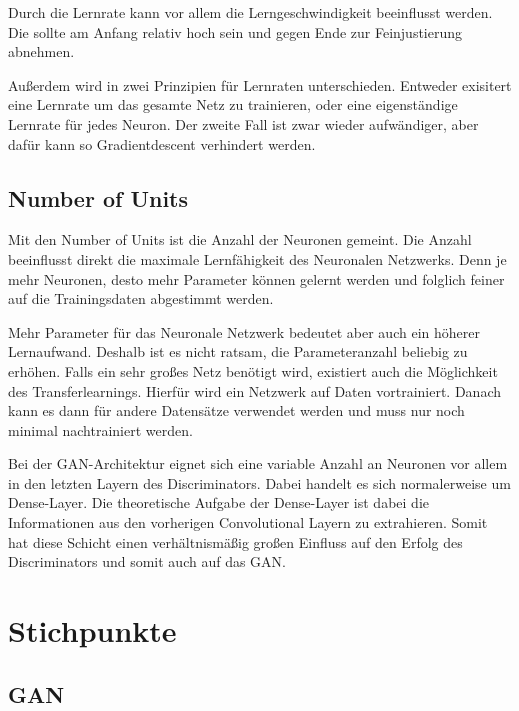 Durch die Lernrate kann vor allem die Lerngeschwindigkeit beeinflusst werden.
Die sollte am Anfang relativ hoch sein und gegen Ende zur Feinjustierung abnehmen.

Außerdem wird in zwei Prinzipien für Lernraten unterschieden.
Entweder exisitert eine Lernrate um das gesamte Netz zu trainieren, oder eine eigenständige Lernrate für jedes Neuron.
Der zweite Fall ist zwar wieder aufwändiger, aber dafür kann so Gradientdescent verhindert werden.

\subsection{Number of Units}
Mit den Number of Units ist die Anzahl der Neuronen gemeint.
Die Anzahl beeinflusst direkt die maximale Lernfähigkeit des Neuronalen Netzwerks.
Denn je mehr Neuronen, desto mehr Parameter können gelernt werden und folglich feiner auf die Trainingsdaten abgestimmt werden.
\newline

Mehr Parameter für das Neuronale Netzwerk bedeutet aber auch ein höherer Lernaufwand.
Deshalb ist es nicht ratsam, die Parameteranzahl beliebig zu erhöhen.
Falls ein sehr großes Netz benötigt wird, existiert auch die Möglichkeit des Transferlearnings. 
Hierfür wird ein Netzwerk auf Daten vortrainiert.
Danach kann es dann für andere Datensätze verwendet werden und muss nur noch minimal nachtrainiert werden. 
\newline

Bei der GAN-Architektur  eignet sich eine variable Anzahl an Neuronen vor allem in den letzten Layern des Discriminators.
Dabei handelt es sich normalerweise um Dense-Layer. 
Die theoretische Aufgabe der Dense-Layer ist dabei die Informationen aus den vorherigen Convolutional Layern zu extrahieren.
Somit hat diese Schicht einen verhältnismäßig großen Einfluss auf den Erfolg des Discriminators und somit auch auf das GAN.


\section{Stichpunkte}
\subsection{GAN}
